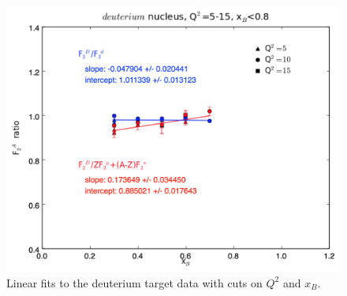 \documentclass[oneside]{article}
\begin{document}
\begin{figure}
\begin{minipage}{0.5\textwidth}
\end{minipage}\hfill\begin{minipage}{0.5\textwidth}
\includegraphics[width=\textwidth]{plots/q2_all_x_all/all_D.png}
\end{minipage}
  \caption[]{Linear fits to the deuterium target data with cuts on $Q^2$ and $x_B$.}
  \label{fig:fits_D}
\end{figure}  
\end{document}
